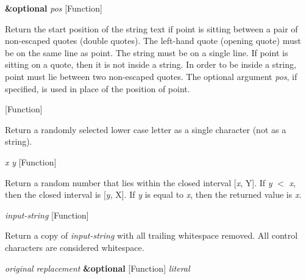 \vspace{1em}
\noindent
{}
\usebox{\funcname}\textbf{\&optional} \emph{pos}
 \hfill [Function]

\begin{doc-string}
Return the start position of the string text if point is sitting between a pair
of non-escaped quotes (double quotes).  The left-hand quote (opening quote) must be
on the same line as point.  The string must be on a single line.  If point is sitting
on a quote, then it is not inside a string.  In order to be inside a string, point
must lie between two non-escaped quotes.  The optional argument \emph{pos}, if specified,
is used in place of the position of point.
\end{doc-string}

\vspace{1em}
\noindent
{}
\usebox{\funcname}
 \hfill [Function]

\begin{doc-string}
Return a randomly selected lower case letter as a single character (not as
a string).
\end{doc-string}

\vspace{1em}
\noindent
{}
\usebox{\funcname}\emph{x} \emph{y}
 \hfill [Function]

\begin{doc-string}
Return a random number that lies within the closed interval [\emph{x}, Y].  If \emph{y} $<$ \emph{x}, then the
closed interval is [\emph{y}, X].  If \emph{y} is equal to \emph{x}, then the returned value is \emph{x}.
\end{doc-string}

\vspace{1em}
\noindent
{}
\usebox{\funcname}\emph{input-string}
 \hfill [Function]

\begin{doc-string}
Return a copy of \emph{input-string} with all trailing whitespace removed.  All control
characters are considered whitespace.
\end{doc-string}

\vspace{1em}
\noindent
{}
\usebox{\funcname}\emph{original} \emph{replacement} \textbf{\&optional}
 \hfill [Function]
\hspace*{\wd\funcname}\emph{literal}

